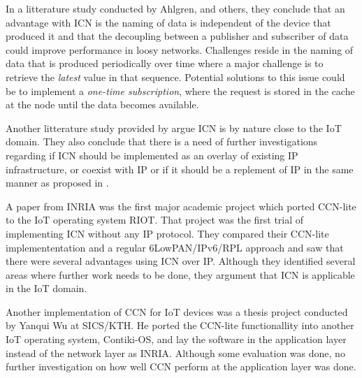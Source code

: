 In a litterature study conducted by Ahlgren, and others, \cite{Ahlgreniot} they conclude that an advantage with ICN is the naming of data is independent of the device that produced it and that the decoupling between a publisher and subscriber of data could improve performance in loosy networks. Challenges reside in the naming of data that is produced periodically over time where a major challenge is to retrieve the \textit{latest} value in that sequence. Potential solutions to this issue could be to implement a \textit{one-time subscription}, where the request is stored in the cache at the node until the data becomes available\cite{Ahlgreniot}. 

Another litterature study provided by \cite{iotchop} argue ICN is by nature close to the IoT domain. They also conclude that there is a need of further investigations regarding if ICN should be implemented as an overlay of existing IP infrastructure, or coexist with IP or if it should be a replement of IP in the same manner as proposed in \cite{Jacobson2009}.

A paper from INRIA was the first major academic project which ported CCN-lite to the IoT operating system RIOT\cite{icniotexpinwild}\cite{RIOT}. That project was the first trial of implementing ICN without any IP protocol. They compared their CCN-lite implemententation and a regular 6LowPAN/IPv6/RPL approach and saw that there were several advantages using ICN over IP. Although they identified several areas where further work needs to be done, they argument that ICN is applicable in the IoT domain.

Another implementation of CCN for IoT devices was a thesis project conducted by Yanqui Wu at SICS/KTH\cite{yanqui}. He ported the CCN-lite functionallity into another IoT operating system, Contiki-OS, and lay the software in the application layer instead of the network layer as INRIA. Although some evaluation was done, no further investigation on how well CCN perform at the application layer was done. \\




